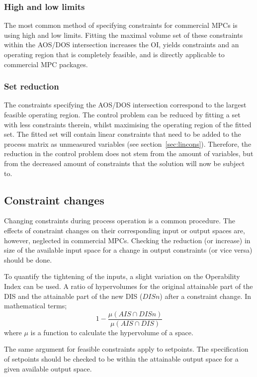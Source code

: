 \documentclass[final,authoryear,5pt,times,twocolumn]{elsarticle}
\begin{document}
\subsubsection{High and low limits}
The most common method of specifying constraints for commercial MPCs is using high and low limits.
Fitting the maximal volume set of these constraints within the AOS/DOS intersection increases the OI, yields constraints and an operating region that is completely feasible, and is directly applicable to commercial MPC packages.
\subsubsection{Set reduction}
The constraints specifying the AOS/DOS intersection correspond to the largest feasible operating region.
The control problem can be reduced by fitting a set with less constraints therein, whilst maximising the operating region of the fitted set.
The fitted set will contain linear constraints that need to be added to the process matrix as unmeasured variables (see section~\ref{sec:lincons}).
Therefore, the reduction in the control problem does not stem from the amount of variables, but from the decreased amount of constraints that the solution will now be subject to.

\subsection{Constraint changes}
Changing constraints during process operation is a common procedure.
The effects of constraint changes on their corresponding input or output spaces are, however, neglected in commercial MPCs.
Checking the reduction (or increase) in size of the available input space for a change in output constraints (or vice versa) should be done.

To quantify the tightening of the inputs, a slight variation on the Operability Index can be used.
A ratio of hypervolumes for the original attainable part of the DIS and the attainable part of the new DIS ($DISn$) after a constraint change.
In mathematical terms;
\begin{equation}
  \label{eq:inputclamp}
  1-\frac{\mu(AIS \cap DISn)}{\mu(AIS \cap DIS)}
\end{equation}
where $\mu$ is a function to calculate the hypervolume of a space.

The same argument for feasible constraints apply to setpoints.
The specification of setpoints should be checked to be within the attainable output space for a given available output space.
\end{document}
